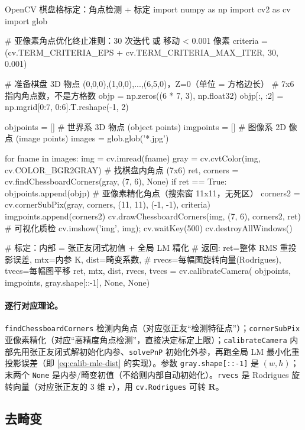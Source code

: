 \begin{codebox}[Python]{OpenCV 棋盘格标定：角点检测 + 标定}
import numpy as np
import cv2 as cv
import glob

# 亚像素角点优化终止准则：30 次迭代 或 移动 < 0.001 像素
criteria = (cv.TERM_CRITERIA_EPS + cv.TERM_CRITERIA_MAX_ITER, 30, 0.001)

# 准备棋盘 3D 物点 (0,0,0),(1,0,0),...,(6,5,0)，Z=0（单位 = 方格边长）
# 7x6 指内角点数，不是方格数
objp = np.zeros((6 * 7, 3), np.float32)
objp[:, :2] = np.mgrid[0:7, 0:6].T.reshape(-1, 2)

objpoints = []   # 世界系 3D 物点 (object points)
imgpoints = []   # 图像系 2D 像点 (image points)
images = glob.glob('*.jpg')

for fname in images:
    img = cv.imread(fname)
    gray = cv.cvtColor(img, cv.COLOR_BGR2GRAY)
    # 找棋盘内角点 (7x6)
    ret, corners = cv.findChessboardCorners(gray, (7, 6), None)
    if ret == True:
        objpoints.append(objp)
        # 亚像素精化角点（搜索窗 11x11，无死区）
        corners2 = cv.cornerSubPix(gray, corners, (11, 11), (-1, -1), criteria)
        imgpoints.append(corners2)
        cv.drawChessboardCorners(img, (7, 6), corners2, ret)  # 可视化质检
        cv.imshow('img', img); cv.waitKey(500)
cv.destroyAllWindows()

# 标定：内部 = 张正友闭式初值 + 全局 LM 精化
# 返回: ret=整体 RMS 重投影误差, mtx=内参 K, dist=畸变系数,
#       rvecs=每幅图旋转向量(Rodrigues), tvecs=每幅图平移
ret, mtx, dist, rvecs, tvecs = cv.calibrateCamera(
        objpoints, imgpoints, gray.shape[::-1], None, None)
\end{codebox}

\paragraph{逐行对应理论。}
\texttt{findChessboardCorners} 检测内角点（对应张正友“检测特征点”）；\texttt{cornerSubPix} 亚像素精化（对应“高精度角点检测”，直接决定标定上限）；\texttt{calibrateCamera} 内部先用张正友闭式解初始化内参、\texttt{solvePnP} 初始化外参，再跑全局 LM 最小化重投影误差（即 \cref{eq:calib-mle-dist} 的实现）\cite{opencv2024calib}。参数 \texttt{gray.shape[::-1]} 是 $(w,h)$；末两个 \texttt{None} 是内参/畸变初值（不给则内部自动初始化）。\texttt{rvecs} 是 Rodrigues 旋转向量（对应张正友的 $3$ 维 $\mathbf{r}$），用 \texttt{cv.Rodrigues} 可转 $\mathbf{R}$。

\subsection{去畸变}

